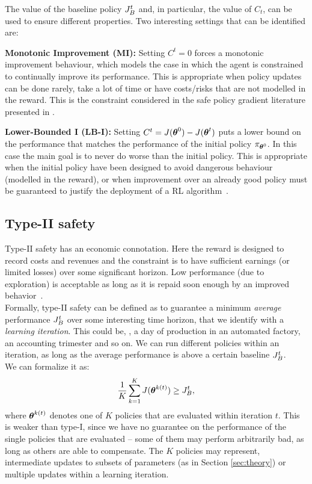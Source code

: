 The value of the baseline policy $\jbase[t]$ and, in particular, the value of $C_t$, can be used to ensure different properties. Two interesting settings that can be identified are:

\textbf{Monotonic Improvement (MI):} Setting $C^t= 0$ forces a monotonic improvement behaviour, which models the case in which the agent is constrained to continually improve its performance. This is appropriate when policy updates can be done rarely, take a lot of time or have costs/risks that are not modelled in the reward. This is the constraint considered in the safe policy gradient literature presented in .

\textbf{Lower-Bounded I (LB-I):}
Setting $C^t = J(\vtheta^0) - J(\vtheta^t)$ puts a lower bound on the performance that matches the performance of the initial policy $\pi_{\vtheta^0}$. In this case the main goal is to never do worse than the initial policy. This is appropriate when the initial policy have been designed to avoid dangerous behaviour (modelled in the reward), or when improvement over an already good policy must be guaranteed to justify the deployment of a RL algorithm~\cite{pmlr-v37-thomas15}.



\subsection{Type-II safety}

Type-II safety has an economic connotation. Here the reward is designed to record costs and revenues and the constraint is to have sufficient earnings (or limited losses) over some significant horizon. Low performance (\eg due to exploration) is acceptable as long as it is repaid soon enough by an improved behavior~\cite{adaptive_batch}\cite{pmlr-v37-thomas15}.\\
Formally, type-II safety can be defined as to guarantee a minimum \textit{average} performance $\jbase$ over some interesting time horizon, that we identify with a \textit{learning iteration}. This could be, \eg, a day of production in an automated factory, an accounting trimester and so on. We can run different policies within an iteration, as long as the average performance is above a certain baseline $\jbase$.\\
We can formalize it as: 
\begin{align}\label{con:6}
\frac{1}{K}\sum_{k=1}^{K}J(\vtheta^{k(t)}) \geq \jbase,
\end{align}
where $\vtheta^{k(t)}$ denotes one of $K$ policies that are evaluated within iteration $t$. This is weaker than type-I, since we have no guarantee on the performance of the single policies that are evaluated -- some of them may perform arbitrarily bad, as long as others are able to compensate. The $K$ policies may represent, \eg intermediate updates to subsets of parameters (as in Section \ref{sec:theory}) or multiple updates within a learning iteration. 

